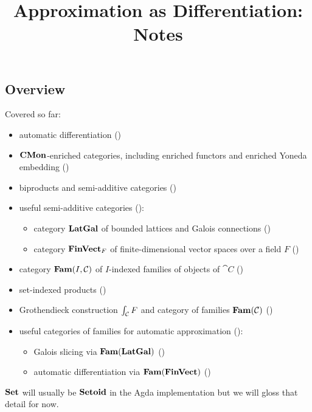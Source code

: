 \documentclass[acmsmall,screen]{acmart}
\begin{document}
\title{Approximation as Differentiation: Notes}

\maketitle

\subsection{Overview}

Covered so far:
\begin{itemize}
\item automatic differentiation ()
\item $\mathbf{CMon}$-enriched categories, including enriched functors and enriched Yoneda embedding ()
\item biproducts and semi-additive categories ()
\item useful semi-additive categories ():
   \begin{itemize}
   \item category $\mathbf{LatGal}$ of bounded lattices and Galois connections ()
   \item category $\mathbf{FinVect}_F$ of finite-dimensional vector spaces over a field $F$
   ()
   \end{itemize}
\item category $\mathbf{Fam}(I,\mathcal{C})$ of $I$-indexed families of objects of $\cat{C}$ ()
\item set-indexed products ()
\item Grothendieck construction $\int_{\mathcal{C}}F$ and category of families $\mathbf{Fam}(\mathcal{C})$
()
\item useful categories of families for automatic approximation
():
   \begin{itemize}
      \item Galois slicing via $\mathbf{Fam}(\mathbf{LatGal})$ ()
      \item automatic differentiation via $\mathbf{Fam}(\mathbf{FinVect})$ ()
   \end{itemize}
\end{itemize}

\noindent $\mathbf{Set}$ will usually be $\mathbf{Setoid}$ in the Agda implementation but we will gloss that detail for now.

















\end{document}
